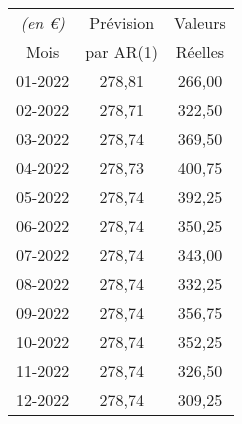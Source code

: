 \begin{tabular}{ccc}
\toprule
\textit{(en \euro)} & Prévision & Valeurs\\
Mois  & par AR(1) & Réelles \\
\midrule
01-2022 & 278,81 & 266,00 \\
02-2022 & 278,71 & 322,50 \\
03-2022 & 278,74 & 369,50 \\
04-2022 & 278,73 & 400,75 \\
05-2022 & 278,74 & 392,25 \\
06-2022 & 278,74 & 350,25 \\
07-2022 & 278,74 & 343,00    \\
08-2022 & 278,74 & 332,25 \\
09-2022 & 278,74 & 356,75 \\
10-2022 & 278,74 & 352,25 \\
11-2022 & 278,74 & 326,50 \\
12-2022 & 278,74 & 309,25 \\
\bottomrule
\end{tabular}%
